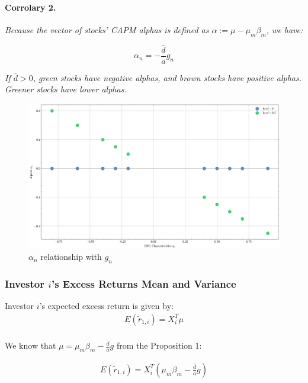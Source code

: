 \paragraph{Corrolary 2.} \textit{Because the vector of stocks' CAPM alphas is defined as 
$\alpha := \mu - \mu_m \beta_m$, we have:}

\begin{equation}
    \alpha_n = - \frac{\bar{d}}{a} g_n
\end{equation}

\textit{If $\bar{d} > 0$, green stocks have negative alphas, and brown stocks 
have positive alphas. Greener stocks have lower alphas.}


\begin{figure}
    \centering
    \includegraphics[width=1\textwidth]{../images/chapter02/alphas_vs_esg_characteristics.png}
    \caption{$\alpha_n$ relationship with $g_n$}
    \label{fig:esg_returns}
\end{figure}

\subsubsection{Investor $i$'s Excess Returns Mean and Variance}

Investor $i$'s expected excess return is given by:
\begin{equation}
    \begin{aligned}
E(\tilde{r}_{1,i}) = X_i^T \mu \\ 
    \end{aligned}
\end{equation}

We know that $\mu = \mu_m \beta_m - \frac{\bar{d}}{a} g$ from the Proposition 1:

\begin{equation}
    \begin{aligned}
E(\tilde{r}_{1,i}) = X_i^T (\mu_m \beta_m - \frac{\bar{d}}{a} g) \\
    \end{aligned}
\end{equation}

